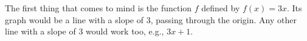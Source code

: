 The first thing that comes to mind is the function $f$ defined by
$f(x)=3x$. Its graph would be a line with a slope of 3,
passing through the origin. Any other line with a slope of 3 would work too, e.g.,
$3x+1$.
